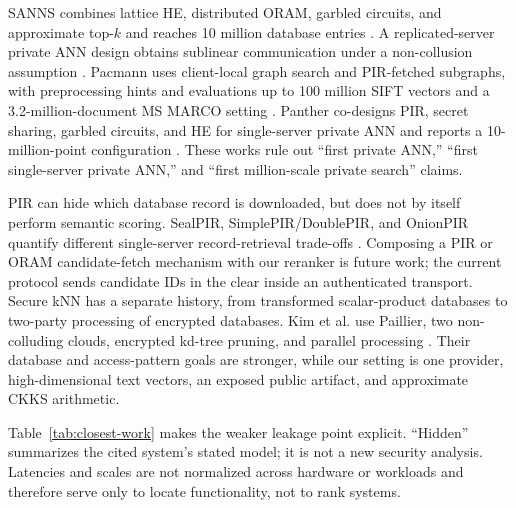 \documentclass[pdflatex,sn-basic,Numbered]{sn-jnl}
\theoremstyle{plain}
\begin{document}
SANNS combines lattice HE, distributed ORAM, garbled circuits, and approximate top-$k$ and reaches 10 million database entries \cite{Chen2020SANNS}. A replicated-server private ANN design obtains sublinear communication under a non-collusion assumption \cite{ServanSchreiber2022PrivateANN}. Pacmann uses client-local graph search and PIR-fetched subgraphs, with preprocessing hints and evaluations up to 100 million SIFT vectors and a 3.2-million-document MS MARCO setting \cite{Zhou2025Pacmann}. Panther co-designs PIR, secret sharing, garbled circuits, and HE for single-server private ANN and reports a 10-million-point configuration \cite{Li2025Panther}. These works rule out ``first private ANN,'' ``first single-server private ANN,'' and ``first million-scale private search'' claims.

PIR can hide which database record is downloaded, but does not by itself perform semantic scoring. SealPIR, SimplePIR/DoublePIR, and OnionPIR quantify different single-server record-retrieval trade-offs \cite{Angel2018SealPIR,Henzinger2023SimplePIR,Mughees2021OnionPIR}. Composing a PIR or ORAM candidate-fetch mechanism with our reranker is future work; the current protocol sends candidate IDs in the clear inside an authenticated transport. Secure kNN has a separate history, from transformed scalar-product databases \cite{Wong2009SecureKNN} to two-party processing of encrypted databases. Kim et al. use Paillier, two non-colluding clouds, encrypted kd-tree pruning, and parallel processing \cite{Kim2022PrivateKNN}. Their database and access-pattern goals are stronger, while our setting is one provider, high-dimensional text vectors, an exposed public artifact, and approximate CKKS arithmetic.

Table~\ref{tab:closest-work} makes the weaker leakage point explicit. ``Hidden'' summarizes the cited system's stated model; it is not a new security analysis. Latencies and scales are not normalized across hardware or workloads and therefore serve only to locate functionality, not to rank systems.
\end{document}
